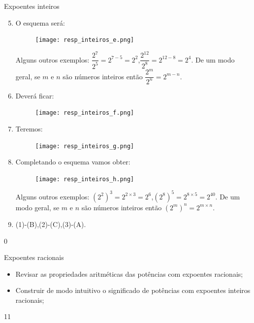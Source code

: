 \begin{answer}{Expoentes inteiros}
{
\begin{enumerate}\setcounter{enumi}{4}
\item
O esquema será:

\begin{figure}[H]
\centering
\noindent\texttt{[image: resp\_inteiros\_e.png]}
\end{figure}

Alguns outros exemplos: $\dfrac{2^7}{2^5} =2^{7-5}=2^2$,\quad $\dfrac{2^{12}}{2^8} =2^{12-8}=2^4$. De um modo geral, se $m$ e $n$ são números inteiros então $\dfrac{2^m}{2^n} =2^{m-n}$.

\item Deverá ficar:

\begin{figure}[H]
\centering
\noindent\texttt{[image: resp\_inteiros\_f.png]}
\end{figure}

\item Teremos:

\begin{figure}[H]
\centering
\noindent\texttt{[image: resp\_inteiros\_g.png]}
\end{figure}

\item Completando o esquema vamos obter:

\begin{figure}[H]
\centering
\noindent\texttt{[image: resp\_inteiros\_h.png]}
\end{figure}

Alguns outros exemplos: $(2^{2})^{3}=2^{2\times3}=2^6$,\quad $(2^{8})^{5}=2^{8\times5}=2^{40}$. De um modo geral, se $m$ e $n$ são números inteiros então $(2^{m})^{n}=2^{m \times n}$.

\item (1)-(B),\quad (2)-(C),\quad (3)-(A).
\end{enumerate}
}{0}
\end{answer}
\clearmargin
\marginpar{\vspace{-1.5em}}
\begin{objectives}{Expoentes racionais}
{
\begin{itemize}
\item Revisar as propriedades aritméticas das potências com expoentes racionais;
\item Construir de modo intuitivo o significado de potências com expoentes inteiros racionais;

\end{itemize}
}{1}{1}
\end{objectives}
